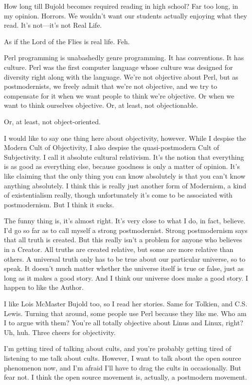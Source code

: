 How long till Bujold becomes required reading in high school? Far too long,
in my opinion. Horrors. We wouldn't want our students actually enjoying what
they read. It's not---it's not Real Life.

As if the Lord of the Flies is real life. Feh.

Perl programming is unabashedly genre programming. It has conventions. It has
culture. Perl was the first computer language whose culture was designed for
diversity right along with the language. We're not objective about Perl, but
as postmodernists, we freely admit that we're not objective, and we try to
compensate for it when we want people to think we're objective. Or when we
want to think ourselves objective. Or, at least, not objectionable.

Or, at least, not object-oriented.

I would like to say one thing here about objectivity, however. While I
despise the Modern Cult of Objectivity, I also despise the quasi-postmodern
Cult of Subjectivity. I call it absolute cultural relativism. It's the notion
that everything is as good as everything else, because goodness is only a
matter of opinion. It's like claiming that the only thing you can know
absolutely is that you can't know anything absolutely. I think this is really
just another form of Modernism, a kind of existentialism really, though
unfortunately it's come to be associated with postmodernism. But I think it
sucks.

The funny thing is, it's almost right. It's very close to what I do, in fact,
believe. I'd go so far as to call myself a strong postmodernist. Strong
postmodernism says that all truth is created. But this really isn't a problem
for anyone who believes in a Creator. All truths are created relative, but
some are more relative than others. A universal truth only has to be true
about our particular universe, so to speak. It doesn't much matter whether
the universe itself is true or false, just as long as it makes a good story.
And I think our universe does make a good story. I happen to like the Author.

I like Lois McMaster Bujold too, so I read her stories. Same for Tolkien, and
C.S. Lewis. Turning that around, some people use Perl because they like me.
Who am I to argue with them? You're all totally objective about Linus and
Linux, right? Uh, huh. Three cheers for objectivity.

I'm getting tired of talking about cults, and you're probably getting tired
of listening to me talk about cults. However, I want to talk about the open
source phenomenon now, and I'm afraid I'll have to drag the cults in
occasionally. But fear not. I think the open source movement is, actually, a
postmodern movement.

